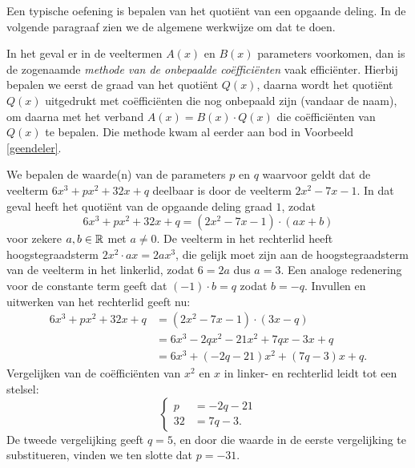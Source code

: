 \documentclass{ximera}
\begin{document}
Een typische oefening is bepalen van het quoti\"ent van een opgaande deling. In de volgende paragraaf zien we de algemene werkwijze om dat te doen. 

In het geval er in de veeltermen $A(x)$ en $B(x)$ parameters voorkomen, dan is de zogenaamde {\em methode van de onbepaalde co\"effici\"enten} vaak effici\"enter. Hierbij bepalen we eerst de graad van het quoti\"ent $Q(x)$, daarna wordt het quoti\"ent $Q(x)$ uitgedrukt met co\"effici\"enten die nog onbepaald zijn (vandaar de naam), om daarna met het verband $A(x) = B(x) \cdot Q(x)$ die co\"effici\"enten van $Q(x)$ te bepalen. Die methode kwam al eerder aan bod in Voorbeeld \ref{geendeler}. 

\begin{example} 
We bepalen de waarde(n) van de parameters $p$ en $q$ waarvoor geldt dat de veelterm $6x^3+px^2+32x+q$ deelbaar is door de veelterm $2x^2-7x-1$. In dat geval heeft het quoti\"ent van de opgaande deling graad $1$, zodat 
\[
6x^3+px^2+32x+q = (2x^2-7x-1)\cdot (ax+b)
\]
voor zekere $a,b \in \mathbb{R}$ met $a \neq 0$. De veelterm in het rechterlid heeft hoogstegraadsterm $2x^2 \cdot ax = 2ax^3$, die gelijk moet zijn aan de hoogstegraadsterm van de veelterm in het linkerlid, zodat $6 = 2a$ dus $a = 3$. Een analoge redenering voor de constante term geeft dat $(-1) \cdot b = q$ zodat $b = -q$. Invullen en uitwerken van het rechterlid geeft nu:
\begin{align*}
6x^3+px^2+32x+q 
& = (2x^2-7x-1)\cdot (3x-q) \\
& = 6x^3 - 2qx^2 - 21x^2 + 7qx - 3x + q \\
& = 6x^3 + (-2q-21)x^2 + (7q-3)x+q.
\end{align*}
Vergelijken van de co\"effici\"enten van $x^2$ en $x$ in linker- en rechterlid leidt tot een stelsel:
\[
\left\{ 
\begin{aligned}
p & = -2q - 21 \\
32 & = 7q - 3. 
\end{aligned}
\right.
\]
De tweede vergelijking geeft $q = 5$, en door die waarde in de eerste vergelijking te substitueren, vinden we ten slotte dat $p = -31$.  
\end{example} 
\end{document}
